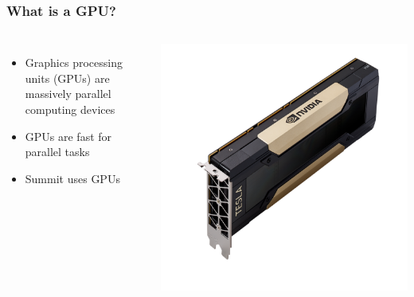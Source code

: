 \documentclass{beamer}
\begin{document}
\begin{frame}
\frametitle{What is a GPU?}

\begin{columns}
\begin{itemize}
\item Graphics processing units (GPUs) are massively parallel computing devices
\item GPUs are fast for parallel tasks
\item Summit uses GPUs
\end{itemize}

\includegraphics[width=\textwidth]{v100.png}

\end{columns}

\end{frame}
\end{document}
